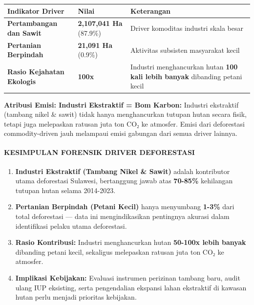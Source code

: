 \documentclass[
]{article}
\newcounter{none} %
\providecommand{\tightlist}{%
  \setlength{\itemsep}{0pt}\setlength{\parskip}{0pt}}
\begin{document}
{\def\LTcaptype{none} %
\begin{longtable}[]{@{}
  >{\raggedright\arraybackslash}p{}
  >{\raggedright\arraybackslash}p{}
  >{\raggedright\arraybackslash}p{}@{}}
\toprule\noalign{}
\begin{minipage}[b]{\linewidth}\raggedright
Indikator Driver
\end{minipage} & \begin{minipage}[b]{\linewidth}\raggedright
Nilai
\end{minipage} & \begin{minipage}[b]{\linewidth}\raggedright
Keterangan
\end{minipage} \\
\midrule\noalign{}
\endhead
\bottomrule\noalign{}
\endlastfoot
\textbf{Pertambangan dan Sawit} & \textbf{2,107,041 Ha} (87.9\%) &
Driver komoditas industri skala besar \\
\textbf{Pertanian Berpindah} & \textbf{21,091 Ha} (0.9\%) & Aktivitas
subsisten masyarakat kecil \\
\textbf{Rasio Kejahatan Ekologis} & \textbf{100x} & Industri
menghancurkan hutan \textbf{100 kali lebih banyak} dibanding petani
kecil \\
\end{longtable}
}

\textbf{Atribusi Emisi: Industri Ekstraktif = Bom Karbon:} Industri
ekstraktif (tambang nikel \& sawit) tidak hanya menghancurkan tutupan
hutan secara fisik, tetapi juga melepaskan ratusan juta ton CO₂ ke
atmosfer. Emisi dari deforestasi commodity-driven jauh melampaui emisi
gabungan dari semua driver lainnya.

\paragraph{KESIMPULAN FORENSIK DRIVER
DEFORESTASI}\label{kesimpulan-forensik-driver-deforestasi}

\begin{enumerate}
\def\labelenumi{\arabic{enumi}.}
\tightlist
\item
  \textbf{Industri Ekstraktif (Tambang Nikel \& Sawit)} adalah
  kontributor utama deforestasi Sulawesi, bertanggung jawab atas
  \textbf{70-85\%} kehilangan tutupan hutan selama 2014-2023.
\item
  \textbf{Pertanian Berpindah (Petani Kecil)} hanya menyumbang
  \textbf{1-3\%} dari total deforestasi --- data ini mengindikasikan
  pentingnya akurasi dalam identifikasi pelaku utama deforestasi.
\item
  \textbf{Rasio Kontribusi:} Industri menghancurkan hutan
  \textbf{50-100x lebih banyak} dibanding petani kecil, sekaligus
  melepaskan ratusan juta ton CO₂ ke atmosfer.
\item
  \textbf{Implikasi Kebijakan:} Evaluasi instrumen perizinan tambang
  baru, audit ulang IUP eksisting, serta pengendalian ekspansi lahan
  ekstraktif di kawasan hutan perlu menjadi prioritas kebijakan.
\end{enumerate}
\end{document}
